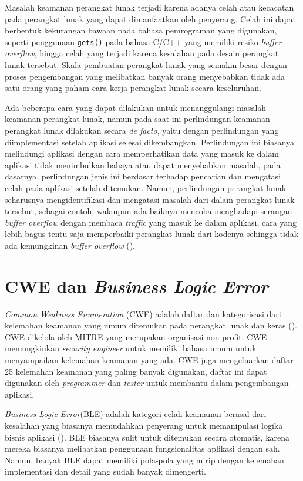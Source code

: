 Masalah keamanan perangkat lunak terjadi karena adanya celah atau kecacatan pada perangkat lunak yang dapat
dimanfaatkan oleh penyerang. Celah ini dapat berbentuk kekurangan bawaan pada bahasa pemrograman yang digunakan,
seperti penggunaan \texttt{gets()} pada bahasa C/C++ yang memiliki resiko \emph{buffer overflow},
hingga celah yang terjadi
karena kesalahan pada desain perangkat lunak tersebut. Skala pembuatan perangkat lunak yang semakin besar
dengan proses pengembangan yang melibatkan banyak orang menyebabkan tidak ada satu orang yang paham
cara kerja perangkat lunak secara keseluruhan.

Ada beberapa cara yang dapat dilakukan untuk menanggulangi masalah keamanan perangkat lunak,
namun pada saat ini perlindungan keamanan perangkat lunak dilakukan secara \emph{de facto},
yaitu dengan perlindungan yang diimplementasi setelah aplikasi selesai dikembangkan.
Perlindungan ini biasanya melindungi aplikasi dengan cara memperhatikan data yang masuk
ke dalam aplikasi tidak menimbulkan bahaya atau dapat menyebabkan masalah, pada dasarnya,
perlindungan jenis ini berdasar terhadap pencarian dan mengatasi celah pada aplikasi setelah ditemukan.
Namun, perlindungan perangkat lunak seharusnya mengidentifikasi dan mengatasi masalah dari
dalam perangkat lunak tersebut, sebagai contoh, walaupun ada baiknya mencoba menghadapi serangan
\emph{buffer overflow} dengan membaca \emph{traffic} yang masuk ke dalam aplikasi,
cara yang lebih bagus tentu saja memperbaiki perangkat lunak dari kodenya sehingga
tidak ada kemungkinan \emph{buffer overflow} (\cite{grawsec}).


\section{CWE dan \emph{Business Logic Error}}

\emph{Common Weakness Enumeration} (CWE) adalah daftar dan kategorisasi dari kelemahan keamanan
yang umum ditemukan pada perangkat lunak dan keras (\cite{cwe}). CWE dikelola oleh MITRE
yang merupakan organisasi non profit. CWE memungkinkan \emph{security engineer} untuk memiliki
bahasa umum untuk menyampaikan kelemahan keamanan yang ada. CWE juga mengeluarkan daftar 25
kelemahan keamanan yang paling banyak digunakan, daftar ini dapat digunakan oleh \emph{programmer}
dan \emph{tester} untuk membantu dalam pengembangan aplikasi.

\emph{Business Logic Error}(BLE) adalah kategori celah keamanan berasal dari kesalahan
yang biasanya memudahkan penyerang untuk memanipulasi logika bisnis aplikasi (\cite{ble_cwe}).
BLE biasanya sulit untuk ditemukan secara otomatis, karena mereka biasanya melibatkan
penggunaan fungsionalitas aplikasi dengan sah. Namun, banyak BLE dapat memiliki
pola-pola yang mirip dengan kelemahan implementasi dan detail yang sudah banyak dimengerti.

